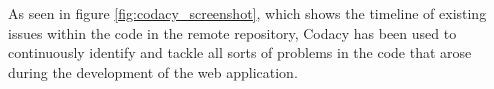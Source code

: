 As seen in figure \ref{fig:codacy_screenshot}, which shows the timeline of existing issues within the code in the remote repository, Codacy has been used to continuously identify and tackle all sorts of problems in the code that arose during the development of the web application.
